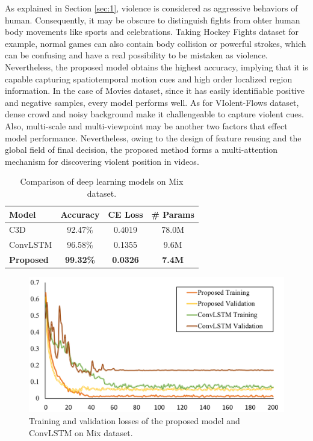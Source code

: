 \documentclass[10pt,twocolumn,letterpaper]{article}
\begin{document}
As explained in Section \ref{sec:1}, violence is considered as aggressive behaviors of human. 
Consequently, it may be obscure to distinguish fights from ohter human body movements like sports and celebrations.
Taking Hockey Fights dataset for example, normal games can also contain body collision or powerful strokes, which can be confusing and have a real possibility to be mistaken as violence.
Nevertheless, the proposed model obtains the highest accuracy, implying that it is capable capturing spatiotemporal motion cues and high order localized region information. 
In the case of Movies dataset, since it has easily identifiable positive and negative samples, every model performs well.
As for VIolent-Flows dataset, dense crowd and noisy background make it challengeable to capture violent cues. 
Also, multi-scale and multi-viewpoint may be  another two factors that effect model performance.
Nevertheless, owing to the design of feature reusing and the global field of final decision, the proposed method forms a multi-attention mechanism for discovering violent position in videos.


\begin{table}
\begin{center}
\caption{Comparison of deep learning models on Mix dataset.}
\label{table:mix}
\begin{tabular}{lccc}
\hline
\textbf{Model} & \textbf{Accuracy} & \textbf{CE Loss} & \textbf{\# Params} \\
\hline\hline
C3D \cite{3dcnn_1} & 92.47\% & 0.4019 & 78.0M \\
ConvLSTM \cite{convlstm_sudh} & 96.58\% & 0.1355 & 9.6M \\
\textbf{Proposed} & \textbf{99.32\%} & \textbf{0.0326} & \textbf{7.4M} \\
\hline
\end{tabular}
\end{center}
\end{table}

\begin{figure}[t]
\begin{center}
\includegraphics[scale=0.46]{fig/fig3.png}
\end{center}
\caption{Training and validation losses of the proposed model and ConvLSTM \cite{convlstm_sudh} on Mix dataset.}
\label{fig:mix}
\end{figure}
\end{document}
